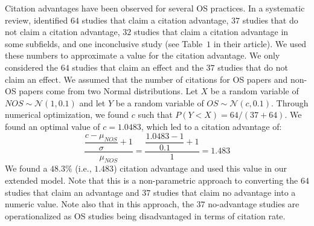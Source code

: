 \documentclass[meta, authordate]{jote-new-article}
\begin{document}
\begin{enumerate}
        Citation advantages have been observed for several OS practices. In a systematic review, \textcite{LanghamputrowBakkerRiegelman2021} identified $64$ studies that claim a citation advantage, $37$ studies that do not claim a citation advantage, $32$ studies that claim a citation advantage in some subfields, and one inconclusive study (see Table~$1$ in their article). We used these numbers to approximate a value for the citation advantage. We only considered the $64$ studies that claim an effect and the $37$ studies that do not claim an effect. We assumed that the number of citations for OS papers and non-OS papers come from two Normal distributions. Let $X$ be a random variable of $NOS\sim\mathcal{N}\left(1, 0.1\right)$ and let $Y$ be a random variable of $OS\sim\mathcal{N}\left(c, 0.1\right)$. Through numerical optimization, we found $c$ such that $P\left(Y<X\right)=64/\left(37+64\right)$. We found an optimal value of $c=1.0483$, which led to a citation advantage of:
        \begin{equation}
          \dfrac{\dfrac{c-\mu_{NOS}}{\sigma}+1}{\mu_{NOS}}=\dfrac{\dfrac{1.0483-1}{0.1}+1}{1}=1.483
        \end{equation}
        We found a $48.3\%$ (i.e., $1.483$) citation advantage and used this value in our extended model. Note that this is a non-parametric approach to converting the $64$ studies that claim an advantage and $37$ studies that claim no advantage into a numeric value. Note also that in this approach, the $37$ no-advantage studies are operationalized as OS studies being disadvantaged in terms of citation rate.
\end{enumerate}
%
\end{document}
